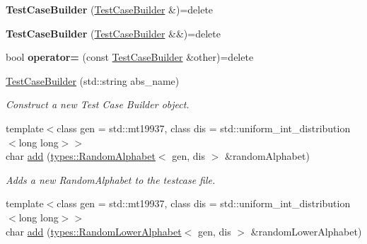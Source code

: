 \begin{DoxyCompactItemize}
\item 
\mbox{\label{classtestcaser_1_1maker_1_1TestCaseBuilder_a1fd3aaeb2829fa473f769b796958409b}} 
{\bfseries Test\+Case\+Builder} (\hyperlink{classtestcaser_1_1maker_1_1TestCaseBuilder}{Test\+Case\+Builder} \&)=delete
\item 
\mbox{\label{classtestcaser_1_1maker_1_1TestCaseBuilder_a8844b0c922621007832f3059e927ceb0}} 
{\bfseries Test\+Case\+Builder} (\hyperlink{classtestcaser_1_1maker_1_1TestCaseBuilder}{Test\+Case\+Builder} \&\&)=delete
\item 
\mbox{\label{classtestcaser_1_1maker_1_1TestCaseBuilder_a30942af2a74179d27ff693917ff4a98f}} 
bool {\bfseries operator=} (const \hyperlink{classtestcaser_1_1maker_1_1TestCaseBuilder}{Test\+Case\+Builder} \&other)=delete
\item 
\hyperlink{classtestcaser_1_1maker_1_1TestCaseBuilder_a1faa00929cc5be8c8bbb312541858e61}{Test\+Case\+Builder} (std\+::string abs\+\_\+name)
\begin{DoxyCompactList}\small\item\em Construct a new Test Case Builder object. \end{DoxyCompactList}\item 
{\footnotesize template$<$class gen  = std\+::mt19937, class dis  = std\+::uniform\+\_\+int\+\_\+distribution$<$long long$>$$>$ }\\char \hyperlink{classtestcaser_1_1maker_1_1TestCaseBuilder_a26c5a045c2b1c4db64f4542aaee326aa}{add} (\hyperlink{classtestcaser_1_1maker_1_1types_1_1RandomAlphabet}{types\+::\+Random\+Alphabet}$<$ gen, dis $>$ \&random\+Alphabet)
\begin{DoxyCompactList}\small\item\em Adds a new Random\+Alphabet to the testcase file. \end{DoxyCompactList}\item 
{\footnotesize template$<$class gen  = std\+::mt19937, class dis  = std\+::uniform\+\_\+int\+\_\+distribution$<$long long$>$$>$ }\\char \hyperlink{classtestcaser_1_1maker_1_1TestCaseBuilder_a0666074618ac122218a4206b5952ca07}{add} (\hyperlink{classtestcaser_1_1maker_1_1types_1_1RandomLowerAlphabet}{types\+::\+Random\+Lower\+Alphabet}$<$ gen, dis $>$ \&random\+Lower\+Alphabet)

\end{DoxyCompactItemize}

